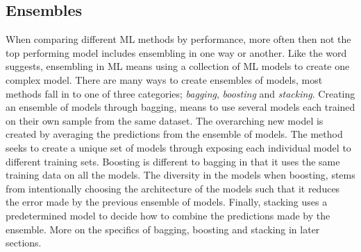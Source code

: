 \subsection{Ensembles}
When comparing different \ac{ML} methods by performance, more often then not the top performing model includes 
ensembling in one way or another. Like the word suggests, ensembling in \ac{ML} means using a collection of 
\ac{ML} models to create one complex model. There are many ways to create ensembles of models, most methods 
fall in to one of three categories; \emph{bagging}, \emph{boosting} and \emph{stacking}. Creating an ensemble of models 
through bagging, means to use several models each trained on their own sample from the same dataset. The overarching 
new model is created by averaging the predictions from the ensemble of models. The method seeks to create a unique set of 
models through exposing each individual model to different training sets. Boosting is different to bagging in that it uses 
the same training data on all the models. The diversity in the models when boosting, stems from intentionally choosing the 
architecture of the models such that it reduces the error made by the previous ensemble of models. Finally, stacking uses 
a predetermined model to decide how to combine the predictions made by the ensemble. More on the specifics of bagging, 
boosting and stacking in later sections.  

  
